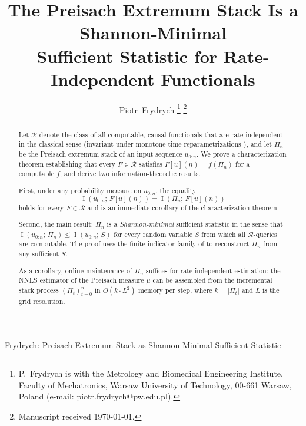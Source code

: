 \documentclass[lettersize,journal]{IEEEtran}
\newcommand{\cR}{\mathcal{R}}
\newcommand{\stack}{\Pi}
\DeclareMathOperator{\MI}{I}
\begin{document}
\title{The Preisach Extremum Stack Is a Shannon-Minimal\\
  Sufficient Statistic for Rate-Independent Functionals}

\author{Piotr~Frydrych%
\thanks{P.~Frydrych is with the Metrology and Biomedical Engineering
Institute, Faculty of Mechatronics, Warsaw University of Technology,
00-661 Warsaw, Poland (e-mail: piotr.frydrych@pw.edu.pl).}%
\thanks{Manuscript received \today.}}

%
{Frydrych: Preisach Extremum Stack as Shannon-Minimal Sufficient Statistic}


\maketitle

\begin{abstract}
Let $\cR$ denote the class of all computable, causal functionals
that are rate-independent in the classical sense (invariant under
monotone time reparametrizations \cite{Brokate1996}), and let
$\stack_n$ be the Preisach extremum stack of an input sequence
$u_{0:n}$.
We prove a characterization theorem establishing that every
$F \in \cR$ satisfies $F[u](n) = f(\stack_n)$ for a computable $f$,
and derive two information-theoretic results.

First, under any probability measure on $u_{0:n}$, the equality
\begin{equation*}
  \MI(u_{0:n};\, F[u](n)) = \MI(\stack_n;\, F[u](n))
\end{equation*}
holds for every $F \in \cR$ and is an immediate corollary of the
characterization theorem.

Second, the main result: $\stack_n$ is a \emph{Shannon-minimal}
sufficient statistic in the sense that
$\MI(u_{0:n};\,\stack_n) \leq \MI(u_{0:n};\,S)$ for every
random variable $S$ from which all $\cR$-queries are computable.
The proof uses the finite indicator family of \cite{Frydrych2026IPL}
to reconstruct $\stack_n$ from any sufficient $S$.

As a corollary, online maintenance of $\stack_n$ suffices for
rate-independent estimation: the NNLS estimator of the Preisach
measure $\mu$ can be assembled from the incremental stack process
$(\stack_t)_{t=0}^n$ in $O(k \cdot L^2)$ memory per step, where
$k = |\stack_t|$ and $L$ is the grid resolution.
\end{abstract}
\end{document}
